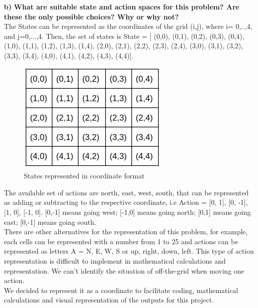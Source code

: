 \documentclass[11pt]{article}
\begin{document}
\noindent
\textbf{b)}
\noindent
\textbf{What are suitable state and action spaces for this problem? Are
these the only possible choices? Why or why not?}
\\

\noindent
The States can be represented as the coordinates of the grid (i,j), where i=
0,..,4, and j=0,...,4. Then, the set of states is State = {[ (0,0), (0,1),
(0,2), (0,3), (0,4), (1,0), (1,1), (1,2), (1,3), (1,4), (2,0), (2,1), (2,2),
(2,3), (2,4), (3,0), (3,1), (3,2), (3,3), (3,4), (4,0), (4,1), (4,2), (4,3),
(4,4)]}.
\\

\begin{figure}[h]
\includegraphics[scale=0.5]{states}
\centering
\caption{States represented in coordinate format}
\end{figure}

\noindent
The available set of actions are north, east, west, south, that can be
represented as adding or subtracting to the respective coordinate, i.e Action =
{[0, 1], [0, -1], [1, 0], [-1, 0]}. [0,-1] means going west; [-1,0] means going
north; [0,1] means going east; [0,-1] means going south.
\\

\noindent
There are other alternatives for the representation of this problem, for
example, each cells can be represented with a number from 1 to 25 and actions
can be represented as letters A = {N, E, W, S} or {up, right, down, left}. This
type of action representation is difficult to implement in mathematical
calculations and representation. We can’t identify the situation of off-the-grid
when moving one action.
\\

\noindent
We decided to represent it as a coordinate to facilitate coding, mathematical
calculations and visual representation of the outputs for this project. 
\\
\end{document}
